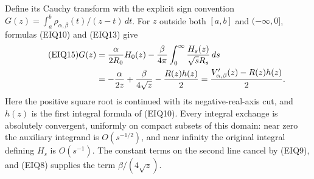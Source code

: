 \documentclass[11pt,a4paper]{article}
\begin{document}
Define its Cauchy transform with the explicit sign convention
$G(z)=\int_a^b\rho_{\alpha,\beta}(t)/(z-t)\,dt$.
For $z$ outside both $[a,b]$ and $(-\infty,0]$, formulas (EIQ10) and
(EIQ13) give
\begin{align}\tag{EIQ15}
 G(z)
 &=\frac\alpha{2R_0}H_0(z)
       -\frac\beta{4\pi}
          \int_0^\infty\frac{H_s(z)}{\sqrt sR_s}\,ds\\
 &=-\frac\alpha{2z}+\frac\beta{4\sqrt z}
       -\frac{R(z)h(z)}2
 =\frac{V'_{\alpha,\beta}(z)-R(z)h(z)}2.\notag
\end{align}
Here the positive square root is continued with its negative-real-axis
cut, and $h(z)$ is the first integral formula of (EIQ10).  Every integral
exchange is absolutely convergent, uniformly on compact subsets of this
domain: near zero the auxiliary integrand is $O(s^{-1/2})$, and near
infinity the original integral defining $H_s$ is $O(s^{-1})$.
The constant terms on the second line cancel by (EIQ9), and (EIQ8)
supplies the term $\beta/(4\sqrt z)$.
\end{document}
